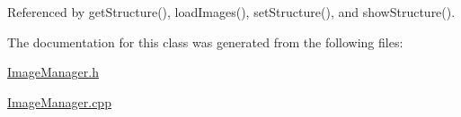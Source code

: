 Referenced by get\+Structure(), load\+Images(), set\+Structure(), and show\+Structure().



The documentation for this class was generated from the following files\+:\begin{DoxyCompactItemize}
\item 
\hyperlink{ImageManager_8h}{Image\+Manager.\+h}\item 
\hyperlink{ImageManager_8cpp}{Image\+Manager.\+cpp}\end{DoxyCompactItemize}

